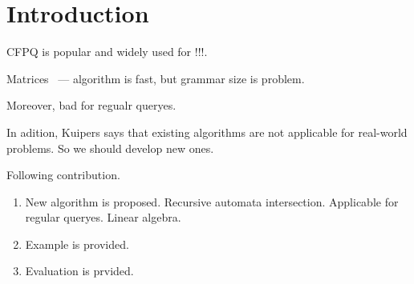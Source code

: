 \section{Introduction}

CFPQ is popular and widely used for !!!.

Matrices~\cite{Azimov:2018:CPQ:3210259.3210264} --- algorithm is fast, but grammar size is problem.

Moreover, bad for regualr queryes.

In adition, Kuipers says that existing algorithms are not applicable for real-world problems. So we should develop new ones.

Following contribution.
\begin{enumerate}
\item New algorithm is proposed. Recursive automata intersection. Applicable for regular queryes. Linear algebra.
\item Example is provided.
\item Evaluation is prvided.
\end{enumerate}


